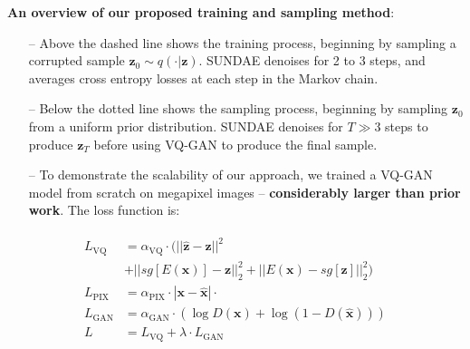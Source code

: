 \documentclass[14pt,margin=0.5in,innermargin=0in,blockverticalspace=-0.1in,colspace=-1.2cm]{tikzposter}
\begin{document}
\begin{columns}
{\begin{tcolorbox}[boxsep=0pt,top=0cm,bottom=0.6cm,adjusted title={\huge\bf Proposed Method},colbacktitle=colorOne]
        {
            \Large
            \textbf{An overview of our proposed training and sampling method}:
            \begin{itemize}
                \item[--] Above the dashed line shows the training process,
                    beginning by sampling a corrupted sample $\mathbf{z}_0 \sim
                    q( \cdot \vert \mathbf{z})$. SUNDAE denoises for 2 to 3
                    steps, and averages cross entropy losses at each step in the
                    Markov chain.
                \item[--] Below the dotted line shows the sampling process,
                    beginning by sampling $\mathbf{z}_0$ from a uniform prior
                    distribution. SUNDAE denoises for $T \gg 3$ steps to produce
                    $\mathbf{z}_T$ before using VQ-GAN to produce the final
                    sample.
                \item[--] To demonstrate the scalability of our approach, we
                    trained a VQ-GAN model from scratch on megapixel images -- 
                    \textbf{considerably larger than prior work}. The loss function is:
            \end{itemize}
        }
            {
                \large
                \centering
        \begin{minipage}{0.49\linewidth}
            \begin{align*}
            \begin{split}
                L_\text{VQ} &= \alpha_\text{VQ} \cdot (||\hat{\mathbf{z}} -
                \mathbf{z}||^2 \\
                            &+ ||sg[E(\mathbf{x})] - \mathbf{z}||^2_2 +
                ||E(\mathbf{x}) - sg[\mathbf{z}]||^2_2)\\
                L_\text{PIX} &= \alpha_\text{PIX} \cdot |\mathbf{x} -
                \hat{\mathbf{x}}| \cdot \\
                L_\text{GAN} &= \alpha_\text{GAN} \cdot \left(\log D(\mathbf{x}) + \log
                (1-D(\hat{\mathbf{x}}))\right) \\
                L &= L_\text{VQ} + \lambda \cdot L_\text{GAN}
            \end{split}
            \end{align*}
        \end{minipage}
        \hfill
        \begin{minipage}{0.49\linewidth}
            \begin{align*}

\end{align*}
\end{minipage}}
\end{tcolorbox}}
\end{columns}
\end{document}
